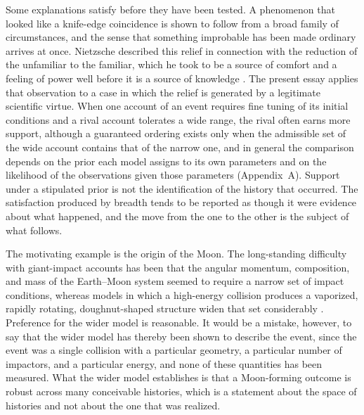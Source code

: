 \documentclass[11pt]{article}
\begin{document}
Some explanations satisfy before they have been tested. A phenomenon that looked like a knife-edge coincidence is shown to follow from a broad family of circumstances, and the sense that something improbable has been made ordinary arrives at once. Nietzsche described this relief in connection with the reduction of the unfamiliar to the familiar, which he took to be a source of comfort and a feeling of power well before it is a source of knowledge \cite{nietzsche-gs,nietzsche-twilight}. The present essay applies that observation to a case in which the relief is generated by a legitimate scientific virtue. When one account of an event requires fine tuning of its initial conditions and a rival account tolerates a wide range, the rival often earns more support, although a guaranteed ordering exists only when the admissible set of the wide account contains that of the narrow one, and in general the comparison depends on the prior each model assigns to its own parameters and on the likelihood of the observations given those parameters (Appendix~A). Support under a stipulated prior is not the identification of the history that occurred. The satisfaction produced by breadth tends to be reported as though it were evidence about what happened, and the move from the one to the other is the subject of what follows.

The motivating example is the origin of the Moon. The long-standing difficulty with giant-impact accounts has been that the angular momentum, composition, and mass of the Earth--Moon system seemed to require a narrow set of impact conditions, whereas models in which a high-energy collision produces a vaporized, rapidly rotating, doughnut-shaped structure widen that set considerably \cite{lock2018}. Preference for the wider model is reasonable. It would be a mistake, however, to say that the wider model has thereby been shown to describe the event, since the event was a single collision with a particular geometry, a particular number of impactors, and a particular energy, and none of these quantities has been measured. What the wider model establishes is that a Moon-forming outcome is robust across many conceivable histories, which is a statement about the space of histories and not about the one that was realized.
\end{document}

